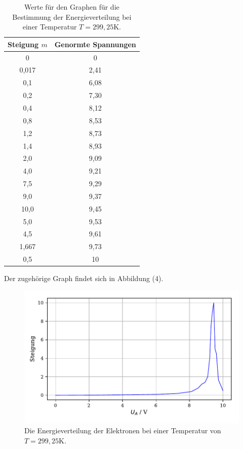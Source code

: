 \begin{table}[H]
  \centering
  \caption{Werte für den Graphen für die Bestimmung der Energieverteilung bei einer Temperatur $T=299,25$K.}
  \label{tab:Parameter}
  \begin{tabular}{c c}
    \toprule
    Steigung $m$ & Genormte Spannungen \\
    \bottomrule
    0 & 0\\
    0,017 & 2,41\\
    0,1 & 6,08\\
    0,2 &7,30\\
    0,4 &8,12\\
    0,8 &8,53\\
    1,2 &8,73\\
    1,4 &8,93\\
    2,0&9,09\\
    4,0 &9,21\\
    7,5 &9,29\\
    9,0 &9,37\\
    10,0 &9,45\\
    5,0 &9,53\\
    4,5 &9,61\\
    1,667&9,73\\
    0,5 & 10\\
    \bottomrule
  \end{tabular}
\end{table}

\noindent Der zugehörige Graph findet sich in Abbildung (4).

\begin{figure}[H]
  \centering
  \includegraphics{plota1.pdf}
  \caption{Die Energieverteilung der Elektronen bei einer Temperatur von $T=299,25$K.}
  \label{fig:plot}
\end{figure}

